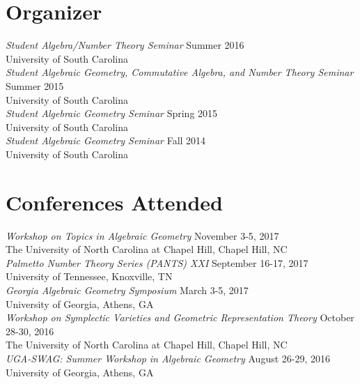 \documentclass{article}
\begin{document}
  \newpage
  \section*{Organizer}
  \textsl{Student Algebra/Number Theory Seminar} \hfill Summer 2016\\
  University of South Carolina\\
  
  \noindent\textsl{Student Algebraic Geometry, Commutative Algebra, and Number Theory Seminar} \hfill Summer 2015\\
  University of South Carolina\\
  
  \noindent\textsl{Student Algebraic Geometry Seminar} \hfill Spring 2015\\
  University of South Carolina\\

  \noindent\textsl{Student Algebraic Geometry Seminar} \hfill Fall 2014\\
  University of South Carolina
  
  \section*{Conferences Attended}
  \textsl{Workshop on Topics in Algebraic Geometry} \hfill November 3-5, 2017\\
  The University of North Carolina at Chapel Hill, Chapel Hill, NC\\
  
  \noindent\textsl{Palmetto Number Theory Series (PANTS) XXI} \hfill September 16-17, 2017\\
  University of Tennessee, Knoxville, TN\\
  
  \noindent\textsl{Georgia Algebraic Geometry Symposium} \hfill March 3-5, 2017\\
  University of Georgia, Athens, GA\\

  \noindent\textsl{Workshop on Symplectic Varieties and Geometric Representation Theory} \hfill October 28-30, 2016\\
  The University of North Carolina at Chapel Hill, Chapel Hill, NC\\
  
  \noindent\textsl{UGA-SWAG: Summer Workshop in Algebraic Geometry} \hfill August 26-29, 2016\\
  University of Georgia, Athens, GA\\
  
\end{document}

